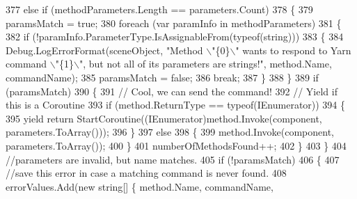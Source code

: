 \begin{DoxyCode}
377                             \textcolor{keywordflow}{else} \textcolor{keywordflow}{if} (methodParameters.Length == parameters.Count)
378                             \{
379                                 paramsMatch = \textcolor{keyword}{true};
380                                 \textcolor{keywordflow}{foreach} (var paramInfo \textcolor{keywordflow}{in} methodParameters)
381                                 \{
382                                     \textcolor{keywordflow}{if} (!paramInfo.ParameterType.IsAssignableFrom(typeof(\textcolor{keywordtype}{string})))
383                                     \{
384                                         Debug.LogErrorFormat(sceneObject, \textcolor{stringliteral}{"Method \(\backslash\)"\{0\}\(\backslash\)" wants to respond
       to Yarn command \(\backslash\)"\{1\}\(\backslash\)", but not all of its parameters are strings!"}, method.Name, commandName);
385                                         paramsMatch = \textcolor{keyword}{false};
386                                         \textcolor{keywordflow}{break};
387                                     \}
388                                 \}
389                                 \textcolor{keywordflow}{if} (paramsMatch)
390                                 \{
391                                     \textcolor{comment}{// Cool, we can send the command!}
392                                     \textcolor{comment}{// Yield if this is a Coroutine}
393                                     \textcolor{keywordflow}{if} (method.ReturnType == typeof(IEnumerator))
394                                     \{
395                                         yield \textcolor{keywordflow}{return} StartCoroutine((IEnumerator)method.Invoke(component, 
      parameters.ToArray()));
396                                     \}
397                                     \textcolor{keywordflow}{else}
398                                     \{
399                                         method.Invoke(component, parameters.ToArray());
400                                     \}
401                                     numberOfMethodsFound++;
402                                 \}
403                             \}
404                             \textcolor{comment}{//parameters are invalid, but name matches.}
405                             \textcolor{keywordflow}{if} (!paramsMatch)
406                             \{
407                                 \textcolor{comment}{//save this error in case a matching command is never found.}
408                                 errorValues.Add(\textcolor{keyword}{new} \textcolor{keywordtype}{string}[] \{ method.Name, commandName, 

\end{DoxyCode}
